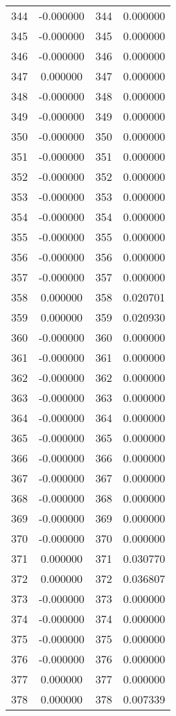 \documentclass[12pt]{article}
\begin{document}
\begin{longtable}{@{}cccc@{}}
344 & -0.000000 & 344 & 0.000000 \\
345 & -0.000000 & 345 & 0.000000 \\
346 & -0.000000 & 346 & 0.000000 \\
347 & 0.000000 & 347 & 0.000000 \\
348 & -0.000000 & 348 & 0.000000 \\
349 & -0.000000 & 349 & 0.000000 \\
350 & -0.000000 & 350 & 0.000000 \\
351 & -0.000000 & 351 & 0.000000 \\
352 & -0.000000 & 352 & 0.000000 \\
353 & -0.000000 & 353 & 0.000000 \\
354 & -0.000000 & 354 & 0.000000 \\
355 & -0.000000 & 355 & 0.000000 \\
356 & -0.000000 & 356 & 0.000000 \\
357 & -0.000000 & 357 & 0.000000 \\
358 & 0.000000 & 358 & 0.020701 \\
359 & 0.000000 & 359 & 0.020930 \\
360 & -0.000000 & 360 & 0.000000 \\
361 & -0.000000 & 361 & 0.000000 \\
362 & -0.000000 & 362 & 0.000000 \\
363 & -0.000000 & 363 & 0.000000 \\
364 & -0.000000 & 364 & 0.000000 \\
365 & -0.000000 & 365 & 0.000000 \\
366 & -0.000000 & 366 & 0.000000 \\
367 & -0.000000 & 367 & 0.000000 \\
368 & -0.000000 & 368 & 0.000000 \\
369 & -0.000000 & 369 & 0.000000 \\
370 & -0.000000 & 370 & 0.000000 \\
371 & 0.000000 & 371 & 0.030770 \\
372 & 0.000000 & 372 & 0.036807 \\
373 & -0.000000 & 373 & 0.000000 \\
374 & -0.000000 & 374 & 0.000000 \\
375 & -0.000000 & 375 & 0.000000 \\
376 & -0.000000 & 376 & 0.000000 \\
377 & 0.000000 & 377 & 0.000000 \\
378 & 0.000000 & 378 & 0.007339 \\

\end{longtable}
\end{document}
